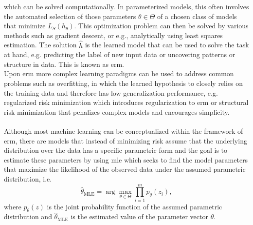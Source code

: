 \begin{tcolorbox}
    which can be solved computationally. In parameterized models, this often involves the automated selection of those parameters $\theta\in\Theta$ of a chosen class of models that minimize $L_{S}(h_\theta)$. This optimization problem can then be solved by various methods such as gradient descent, or e.g., analytically using least squares estimation. The solution $\hat{h}$ is the learned model that can be used to solve the task at hand, e.g. predicting the label of new input data or uncovering patterns or structure in data. This is known as \gls{erm}.\\
    Upon \gls{erm} more complex learning paradigms can be used to address common problems such as overfitting, in which the learned hypothesis to closely relies on the training data and therefore has low generalization performance, e.g. regularized risk minimization which introduces regularization to \gls{erm} or structural risk minimization that penalizes complex models and encourages simplicity.\\
    \\
    Although most machine learning can be conceptualized within the framework of \gls{erm}, there are models that instead of minimizing risk assume that the underlying distribution over the data has a specific parametric form and the goal is to estimate these parameters by using \gls{mle} which seeks to find the model parameters that maximize the likelihood of the observed data under the assumed parametric distribution, i.e. \\
    \begin{equation}
    \hat{\theta}_{\text{MLE}} = \arg\max_{\theta\in\Theta}\prod_{i=1}^{m}p_{\theta}(z_i),
    \end{equation}
    where $p_{\theta}(z)$ is the joint probability function of the assumed parametric distribution and $\hat{\theta}_{\text{MLE}}$ is the estimated value of the parameter vector $\theta$.
\end{tcolorbox}

